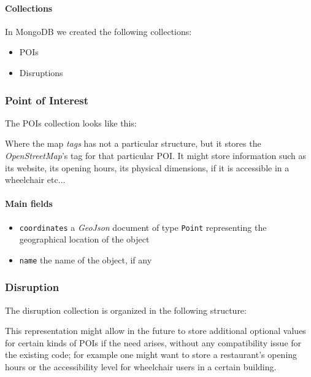 \paragraph{Collections} In MongoDB we created the following collections:

\begin{itemize}
	\item POIs
	\item Disruptions
\end{itemize}

\subsubsection{Point of Interest}
The POIs collection looks like this:



Where the map \textit{tags} has not a particular structure, but it stores the 
\textit{OpenStreetMap}'s tag for that particular POI. It might store 
information such as its website, its opening hours, its physical dimensions, if 
it is accessible in a wheelchair etc...

\paragraph{Main fields}
\begin{itemize}
	\item \texttt{coordinates} a \textit{GeoJson} document of type 
	\texttt{Point} representing the geographical location of the object
	
	\item \texttt{name} the name of the object, if any
\end{itemize}

\subsubsection{Disruption}
The disruption collection is organized in the following structure:



This representation might allow in the future to store additional optional 
values for certain kinds of POIs if the need arises, without any compatibility 
issue for the existing code; for example one might want to store a restaurant’s 
opening hours or the accessibility level for wheelchair users in a certain 
building.


